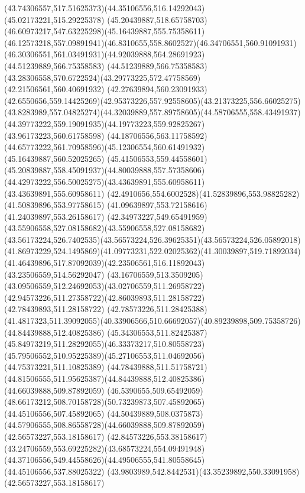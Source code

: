 {{		\curveto(43.74306557,517.51625373)(44.35106556,516.14292043)(45.02173221,515.29225378)
		\curveto(45.20439887,518.65758703)(46.60973217,547.63225298)(45.16439887,555.75358611)
		\curveto(46.12573218,557.09891941)(46.8310655,558.8602527)(46.34706551,560.91091931)
		\curveto(46.30306551,561.03491931)(44.92039888,564.28691923)(44.51239889,566.75358583)
		\curveto(44.51239889,566.75358583)(43.28306558,570.6722524)(43.29773225,572.47758569)
		\lineto(42.21506561,560.40691932)
		\lineto(42.27639894,560.23091933)
		\curveto(42.6550656,559.14425269)(42.95373226,557.92558605)(43.21373225,556.66025275)
		\curveto(43.8283989,557.04825274)(44.32039889,557.89758605)(44.58706555,558.43491937)
		\curveto(44.39773222,559.19091935)(44.19773223,559.92825267)(43.96173223,560.61758598)
		\lineto(44.18706556,563.11758592)
		\curveto(44.65773222,561.70958596)(45.12306554,560.61491932)(45.16439887,560.52025265)
		\curveto(45.41506553,559.44558601)(45.20839887,558.45091937)(44.80039888,557.57358606)
		\curveto(44.42973222,556.50025275)(43.43639891,555.60958611)(43.43639891,555.60958611)
		\curveto(42.4910656,554.6002528)(41.52839896,553.98825282)(41.50839896,553.97758615)
		\lineto(41.09639897,553.72158616)
		\lineto(41.24039897,553.26158617)
		\curveto(42.34973227,549.65491959)(43.55906558,527.08158682)(43.55906558,527.08158682)
		\curveto(43.56173224,526.7402535)(43.56573224,526.39625351)(43.56573224,526.05892018)
		\curveto(41.86973229,524.1495869)(41.09773231,522.02025362)(41.30039897,519.71892034)
		\curveto(41.46439896,517.87092039)(42.23506561,516.11892043)(43.23506559,514.56292047)
		\curveto(43.16706559,513.3509205)(43.09506559,512.24692053)(43.02706559,511.26958722)
		\curveto(42.94573226,511.27358722)(42.86039893,511.28158722)(42.78439893,511.28158722)
		\lineto(42.78573226,511.28425388)
		\curveto(41.4817323,511.39092055)(40.33906566,510.66692057)(40.89239898,509.75358726)
		\moveto(44.84439888,512.40825386)
		\curveto(45.34306553,511.82425387)(45.84973219,511.28292055)(46.33373217,510.80558723)
		\curveto(45.79506552,510.95225389)(45.27106553,511.04692056)(44.75373221,511.10825389)
		\curveto(44.78439888,511.51758721)(44.81506555,511.95625387)(44.84439888,512.40825386)
		\moveto(44.66039888,509.87892059)
		\curveto(46.5390655,509.65492059)(48.66173212,508.70158728)(50.73239873,507.45892065)
		\lineto(44.45106556,507.45892065)
		\curveto(44.50439889,508.0375873)(44.57906555,508.86558728)(44.66039888,509.87892059)
		\moveto(42.56573227,553.18158617)
		\curveto(42.84573226,553.38158617)(43.24706559,553.69225282)(43.68573224,554.09491948)
		\curveto(44.37106556,549.44558626)(44.49506555,541.80558645)(44.45106556,537.88025322)
		\curveto(43.9803989,542.8442531)(43.35239892,550.33091958)(42.56573227,553.18158617)
	}
}
